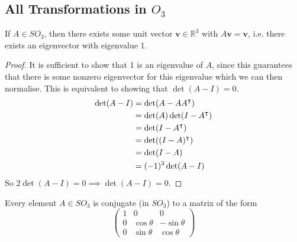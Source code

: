 \documentclass{article}
\begin{document}
	\subsection{All Transformations in $O_3$}
	\begin{theorem}
		If $A \in SO_3$, then there exists some unit vector $\bm v \in \mathbb R^3$ with $A\bm v = \bm v$, i.e. there exists an eigenvector with eigenvalue 1.
	\end{theorem}
	\begin{proof}
		It is sufficient to show that 1 is an eigenvalue of $A$, since this guarantees that there is some nonzero eigenvector for this eigenvalue which we can then normalise. This is equivalent to showing that $\det (A - I) = 0$.
		\begin{align*}
			\det(A - I) &= \det(A - AA^\intercal) \\
			&= \det(A)\det(I - A^\intercal) \\
			&= \det(I - A^\intercal) \\
			&= \det((I - A)^\intercal) \\
			&= \det(I - A) \\
			&= (-1)^3\det(A - I)
		\end{align*}
		So $2\det(A - I) = 0 \implies \det(A - I) = 0$.
	\end{proof}
	\begin{corollary}
		Every element $A \in SO_3$ is conjugate (in $SO_3$) to a matrix of the form
		\[ \begin{pmatrix}
			1 & 0 & 0 \\
			0 & \cos \theta & -\sin \theta \\
			0 & \sin \theta & \cos \theta
		\end{pmatrix} \]
	\end{corollary}
\end{document}
